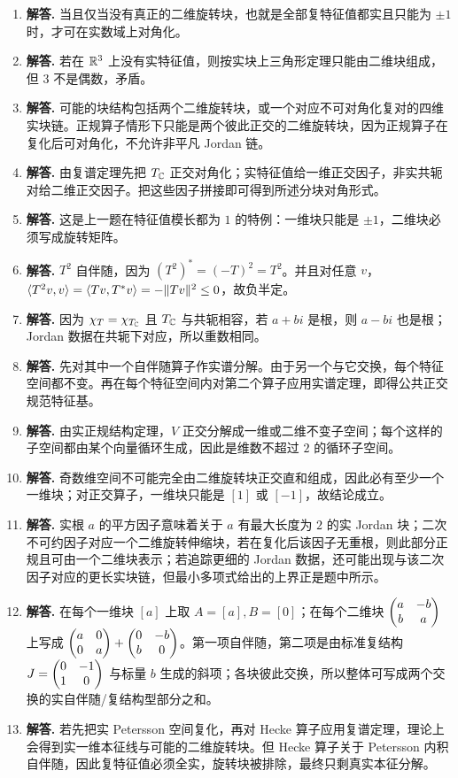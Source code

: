 \begin{enumerate}[label=\textbf{\arabic*.}, leftmargin=*, itemsep=1em]
\item \textbf{解答.} 当且仅当没有真正的二维旋转块，也就是全部复特征值都实且只能为 $\pm1$ 时，才可在实数域上对角化。
\item \textbf{解答.} 若在 $\mathbb{R}^3$ 上没有实特征值，则按实块上三角形定理只能由二维块组成，但 $3$ 不是偶数，矛盾。
\item \textbf{解答.} 可能的块结构包括两个二维旋转块，或一个对应不可对角化复对的四维实块链。正规算子情形下只能是两个彼此正交的二维旋转块，因为正规算子在复化后可对角化，不允许非平凡 Jordan 链。
\item \textbf{解答.} 由复谱定理先把 $T_{\mathbb{C}}$ 正交对角化；实特征值给一维正交因子，非实共轭对给二维正交因子。把这些因子拼接即可得到所述分块对角形式。
\item \textbf{解答.} 这是上一题在特征值模长都为 $1$ 的特例：一维块只能是 $\pm1$，二维块必须写成旋转矩阵。
\item \textbf{解答.} $T^2$ 自伴随，因为 $(T^2)^*=(-T)^2=T^2$。并且对任意 $v$，$\langle T^2v, v \rangle=\langle Tv, T^*v \rangle=-\|Tv\|^2\le0$，故负半定。
\item \textbf{解答.} 因为 $\chi_T=\chi_{T_{\mathbb{C}}}$ 且 $T_{\mathbb{C}}$ 与共轭相容，若 $a+bi$ 是根，则 $a-bi$ 也是根；Jordan 数据在共轭下对应，所以重数相同。
\item \textbf{解答.} 先对其中一个自伴随算子作实谱分解。由于另一个与它交换，每个特征空间都不变。再在每个特征空间内对第二个算子应用实谱定理，即得公共正交规范特征基。
\item \textbf{解答.} 由实正规结构定理，$V$ 正交分解成一维或二维不变子空间；每个这样的子空间都由某个向量循环生成，因此是维数不超过 $2$ 的循环子空间。
\item \textbf{解答.} 奇数维空间不可能完全由二维旋转块正交直和组成，因此必有至少一个一维块；对正交算子，一维块只能是 $[1]$ 或 $[-1]$，故结论成立。
\item \textbf{解答.} 实根 $a$ 的平方因子意味着关于 $a$ 有最大长度为 $2$ 的实 Jordan 块；二次不可约因子对应一个二维旋转伸缩块，若在复化后该因子无重根，则此部分正规且可由一个二维块表示；若追踪更细的 Jordan 数据，还可能出现与该二次因子对应的更长实块链，但最小多项式给出的上界正是题中所示。
\item \textbf{解答.} 在每个一维块 $[a]$ 上取 $A=[a],B=[0]$；在每个二维块 $\begin{pmatrix} a&-b\\b&a \end{pmatrix}$ 上写成
$\begin{pmatrix} a&0\\0&a \end{pmatrix}+\begin{pmatrix} 0&-b\\b&0 \end{pmatrix}$。第一项自伴随，第二项是由标准复结构 $J=\begin{pmatrix} 0&-1\\1&0 \end{pmatrix}$ 与标量 $b$ 生成的斜项；各块彼此交换，所以整体可写成两个交换的实自伴随/复结构型部分之和。
\item \textbf{解答.} 若先把实 Petersson 空间复化，再对 Hecke 算子应用复谱定理，理论上会得到实一维本征线与可能的二维旋转块。但 Hecke 算子关于 Petersson 内积自伴随，因此复特征值必须全实，旋转块被排除，最终只剩真实本征分解。
\end{enumerate}
